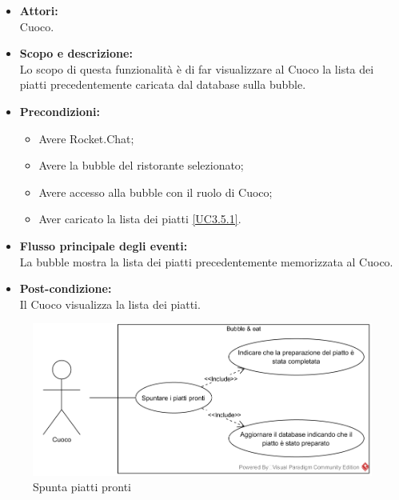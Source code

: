 
\begin{itemize}
	\item \textbf{Attori:}
	\\Cuoco.
	\item \textbf{Scopo e descrizione:} 
	\\Lo scopo di questa funzionalità è di far visualizzare al Cuoco la lista dei piatti precedentemente caricata dal database sulla bubble.
	\item \textbf{Precondizioni:}
	\begin{itemize}
		\item Avere Rocket.Chat;
		\item Avere la bubble del ristorante selezionato;
		\item Avere accesso alla bubble con il ruolo di Cuoco;
		\item Aver caricato la lista dei piatti \ref{UC3.5.1}.
	\end{itemize}
	\item \textbf{Flusso principale degli eventi:}
	\\La bubble mostra la lista dei piatti precedentemente memorizzata al Cuoco.
	\item \textbf{Post-condizione:}
	\\Il Cuoco visualizza la lista dei piatti.
\end{itemize}


\begin{figure}[H]
	\centering
	\includegraphics[width=15cm]{../../documenti/AnalisiDeiRequisiti/Diagrammi_img/uc3_6.png}
	\caption{\UCCaption{} Spunta piatti pronti}
\end{figure}

